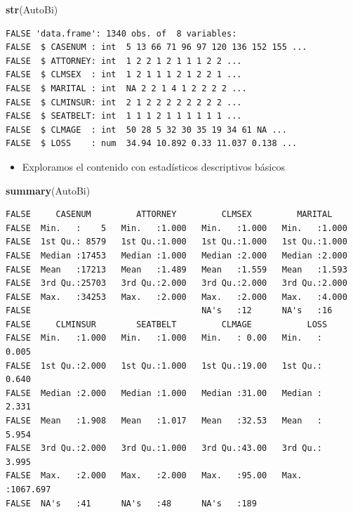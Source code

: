 \documentclass[]{book}
\newenvironment{Shaded}{\begin{snugshade}}{\end{snugshade}}
\newcommand{\KeywordTok}[1]{\textcolor[rgb]{0.13,0.29,0.53}{\textbf{#1}}}
\newcommand{\NormalTok}[1]{#1}
\providecommand{\tightlist}{%
  \setlength{\itemsep}{0pt}\setlength{\parskip}{0pt}}
\begin{document}
\begin{Shaded}
\begin{Highlighting}[]
\KeywordTok{str}\NormalTok{(AutoBi)}
\end{Highlighting}
\end{Shaded}

\begin{verbatim}
FALSE 'data.frame': 1340 obs. of  8 variables:
FALSE  $ CASENUM : int  5 13 66 71 96 97 120 136 152 155 ...
FALSE  $ ATTORNEY: int  1 2 2 1 2 1 1 1 2 2 ...
FALSE  $ CLMSEX  : int  1 2 1 1 1 2 1 2 2 1 ...
FALSE  $ MARITAL : int  NA 2 2 1 4 1 2 2 2 2 ...
FALSE  $ CLMINSUR: int  2 1 2 2 2 2 2 2 2 2 ...
FALSE  $ SEATBELT: int  1 1 1 2 1 1 1 1 1 1 ...
FALSE  $ CLMAGE  : int  50 28 5 32 30 35 19 34 61 NA ...
FALSE  $ LOSS    : num  34.94 10.892 0.33 11.037 0.138 ...
\end{verbatim}

\begin{itemize}
\tightlist
\item
  Exploramos el contenido con estadísticos descriptivos básicos
\end{itemize}

\begin{Shaded}
\begin{Highlighting}[]
\KeywordTok{summary}\NormalTok{(AutoBi)}
\end{Highlighting}
\end{Shaded}

\begin{verbatim}
FALSE     CASENUM         ATTORNEY         CLMSEX         MARITAL     
FALSE  Min.   :    5   Min.   :1.000   Min.   :1.000   Min.   :1.000  
FALSE  1st Qu.: 8579   1st Qu.:1.000   1st Qu.:1.000   1st Qu.:1.000  
FALSE  Median :17453   Median :1.000   Median :2.000   Median :2.000  
FALSE  Mean   :17213   Mean   :1.489   Mean   :1.559   Mean   :1.593  
FALSE  3rd Qu.:25703   3rd Qu.:2.000   3rd Qu.:2.000   3rd Qu.:2.000  
FALSE  Max.   :34253   Max.   :2.000   Max.   :2.000   Max.   :4.000  
FALSE                                  NA's   :12      NA's   :16     
FALSE     CLMINSUR        SEATBELT         CLMAGE           LOSS         
FALSE  Min.   :1.000   Min.   :1.000   Min.   : 0.00   Min.   :   0.005  
FALSE  1st Qu.:2.000   1st Qu.:1.000   1st Qu.:19.00   1st Qu.:   0.640  
FALSE  Median :2.000   Median :1.000   Median :31.00   Median :   2.331  
FALSE  Mean   :1.908   Mean   :1.017   Mean   :32.53   Mean   :   5.954  
FALSE  3rd Qu.:2.000   3rd Qu.:1.000   3rd Qu.:43.00   3rd Qu.:   3.995  
FALSE  Max.   :2.000   Max.   :2.000   Max.   :95.00   Max.   :1067.697  
FALSE  NA's   :41      NA's   :48      NA's   :189
\end{verbatim}
\end{document}
